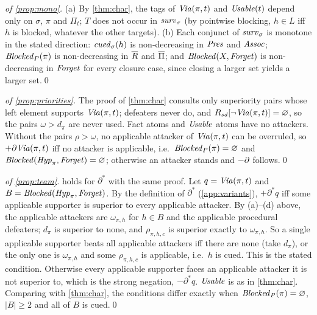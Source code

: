 \begin{proof}[of \cref{prop:mono}]
(a) By \cref{thm:char}, the tags of $\mathit{Via}(\pi,t)$ and $\mathit{Usable}(t)$ depend only on $\sigma$, $\pi$ and $\Pi_t$; $T$ does not occur in $\mathit{surv}_\sigma$ (by pointwise blocking, $h\in L$ iff $h$ is blocked, whatever the other targets). (b) Each conjunct of $\mathit{surv}_\sigma$ is monotone in the stated direction: $\mathit{cued}_\sigma(h)$ is non-decreasing in $\mathit{Pres}$ and $\mathit{Assoc}$; $\mathit{Blocked}_{P}(\pi)$ is non-decreasing in $\overline{R}$ and $\overline{\Pi}$; and $\mathit{Blocked}(X,\mathit{Forget})$ is non-decreasing in $\mathit{Forget}$ for every closure case, since closing a larger set yields a larger set.\qed
\end{proof}

\begin{proof}[of \cref{prop:priorities}]
The proof of \cref{thm:char} consults only superiority pairs whose left element supports $\mathit{Via}(\pi,t)$; defeaters never do, and $R_{\mathit{sd}}[\neg\mathit{Via}(\pi,t)]=\varnothing$, so the pairs $\omega>d_\pi$ are never used. Fact atoms and $\mathit{Usable}$ atoms have no attackers. Without the pairs $\rho>\omega$, no applicable attacker of $\mathit{Via}(\pi,t)$ can be overruled, so $+\partial\mathit{Via}(\pi,t)$ iff no attacker is applicable, i.e.\ $\mathit{Blocked}_{P}(\pi)=\varnothing$ and $\mathit{Blocked}(\mathit{Hyp}_\pi,\mathit{Forget})=\varnothing$; otherwise an attacker stands and $-\partial$ follows.\qed
\end{proof}

\begin{proof}[of \cref{prop:team}]
 holds for $\partial^*$ with the same proof. Let $q=\mathit{Via}(\pi,t)$ and $B=\mathit{Blocked}(\mathit{Hyp}_\pi,\mathit{Forget})$. By the definition of $\partial^*$ (\cref{app:variants}), $+\partial^* q$ iff some applicable supporter is superior to every applicable attacker. By (a)--(d) above, the applicable attackers are $\omega_{\pi,h}$ for $h\in B$ and the applicable procedural defeaters; $d_\pi$ is superior to none, and $\rho_{\pi,h,c}$ is superior exactly to $\omega_{\pi,h}$. So a single applicable supporter beats all applicable attackers iff there are none (take $d_\pi$), or the only one is $\omega_{\pi,h}$ and some $\rho_{\pi,h,c}$ is applicable, i.e.\ $h$ is cued. This is the stated condition. Otherwise every applicable supporter faces an applicable attacker it is not superior to, which is the strong negation, $-\partial^* q$. $\mathit{Usable}$ is as in \cref{thm:char}. Comparing with \cref{thm:char}, the conditions differ exactly when $\mathit{Blocked}_{P}(\pi)=\varnothing$, $|B|\geq2$ and all of $B$ is cued.\qed
\end{proof}

